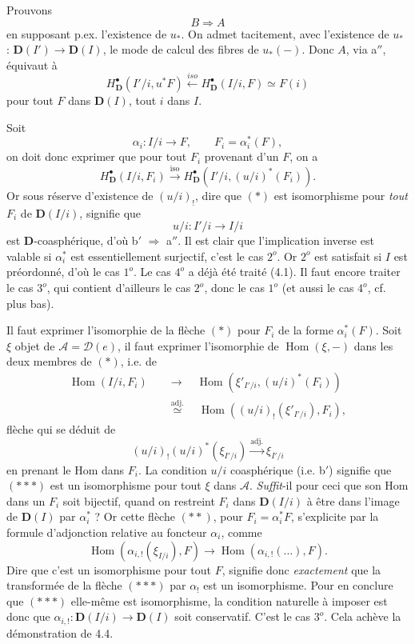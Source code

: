 \documentclass[11pt]{article}
\newcommand{\printedpage}[1]{\marginpar{\footnotesize p.~#1}}
\newcommand{\msp}[1]{\marginpar{\footnotesize [#1]}}
\newcommand{\Hom}{\operatorname{Hom}}
\newcommand{\bD}{\mathbf{D}}
\begin{document}
Prouvons
\[
B \Longrightarrow A
\]
en supposant p.ex. l'existence de $u_*$. On admet tacitement, avec l'existence de $u_*$ : $\bD(I') \longrightarrow \bD(I)$, le mode de calcul des fibres de $u_*(-)$. Donc $A$, via a$''$, équivaut à
\[
H^{\bullet}_{\bD}(I'/i, u^*F) \xleftarrow{\mathit{iso}} H^{\bullet}_{\bD}(I/i, F) \simeq F(i)
\]
\printedpage{38}
pour tout $F$ dans $\bD(I)$, tout $i$ dans $I$.

Soit
\[
\alpha_i : I/i \longrightarrow F, \qquad F_i = \alpha_i^*(F), %
\]
on doit donc exprimer que pour tout $F_i$ provenant d'un $F$, on a
\[
H^{\bullet}_{\bD}(I/i, F_i) \xrightarrow{\mathrm{iso}} H^{\bullet}_{\bD}(I'/i, (u/i)^*(F_i)). \tag*{$(\ast)$}
\]
Or sous réserve d'existence de $(u/i)_!$, dire que $(\ast)$ est isomorphisme pour \textit{tout} $F_i$ de $\bD(I/i)$, signifie que
\[
u/i : I'/i \longrightarrow I/i
\]
\msp{page 62}est $\bD$-coasphérique, d'où b$'$ $\Longrightarrow$ a$''$. Il est clair que l'implication inverse est valable si $\alpha_i^*$ est essentiellement surjectif, c'est le cas $2^o$. Or $2^o$ est satisfait si $I$ est préordonné, d'où le cas $1^o$. Le cas $4^o$ a déjà été traité (4.1). Il faut encore traiter le cas $3^o$, qui contient d'ailleurs le cas $2^o$, donc le cas $1^o$ (et aussi le cas $4^o$, cf. plus bas).

Il faut exprimer l'isomorphie de la flèche $(\ast)$ pour $F_i$ de la forme $\alpha_i^*(F)$. Soit $\xi$ objet de $\mathcal{A} = \mathcal{D}(e)$, il faut exprimer l'isomorphie de $\Hom(\xi, -)$ dans les deux membres de $(\ast)$, i.e. de
\[
\begin{aligned}
\Hom(I/i, F_i) \quad &\longrightarrow \quad \Hom(\xi'_{I'/i}, (u/i)^*(F_i)) \\
&\overset{\text{adj.}}{\simeq} \quad \Hom((u/i)_!(\xi'_{I'/i}), F_i),
\end{aligned}
\tag*{$(\ast\ast)$}
\]
 flèche qui se déduit de
\[
(u/i)_!(u/i)^*(\xi_{I'/i}) \xrightarrow{\text{adj.}} \xi_{I'/i} \tag*{$(\ast\ast\ast)$}
\]
en prenant le Hom dans $F_i$. La condition $u/i$ coasphérique (i.e. b$'$) signifie que $(\ast\ast\ast)$ est un isomorphisme pour tout $\xi$ dans $\mathcal{A}$. \textit{Suffit}-il pour ceci que son Hom dans un $F_i$ soit bijectif, quand on restreint $F_i$ dans $\bD(I/i)$ à être dans l'image de $\bD(I)$ par $\alpha_i^*$ ? Or cette flèche $(\ast\ast)$, pour $F_i = \alpha_i^*F$, s'explicite par la formule d'adjonction relative \msp{page 63}au foncteur $\alpha_i$, comme
\[
\Hom(\alpha_{i,!}(\xi_{I/i}), F) \longrightarrow \Hom(\alpha_{i,!}(\ldots), F).
\]
Dire que c'est un isomorphisme pour tout $F$, signifie donc \textit{exactement} que la transformée de la flèche $(\ast\ast\ast)$ par $\alpha_!$ est un isomorphisme. Pour en conclure que $(\ast\ast\ast)$ elle-même est isomorphisme, la condition naturelle à imposer est donc que $\alpha_{i,!} : \bD(I/i) \longrightarrow \bD(I)$ soit conservatif. C'est le cas $3^o$. Cela achève la démonstration de 4.4.
\end{document}
